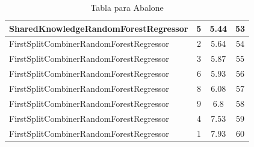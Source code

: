 \begin{table}[h]
\begin{tabular}{|l|c|c|c|}
\textcolor[HTML]{ef9b20}{SharedKnowledgeRandomForestRegressor} & 5 & 5.44 & 53 \\ \hline
\textcolor[HTML]{ea5545}{FirstSplitCombinerRandomForestRegressor} & 2 & 5.64 & 54 \\ \hline
\textcolor[HTML]{ea5545}{FirstSplitCombinerRandomForestRegressor} & 3 & 5.87 & 55 \\ \hline
\textcolor[HTML]{ea5545}{FirstSplitCombinerRandomForestRegressor} & 6 & 5.93 & 56 \\ \hline
\textcolor[HTML]{ea5545}{FirstSplitCombinerRandomForestRegressor} & 8 & 6.08 & 57 \\ \hline
\textcolor[HTML]{ea5545}{FirstSplitCombinerRandomForestRegressor} & 9 & 6.8 & 58 \\ \hline
\textcolor[HTML]{ea5545}{FirstSplitCombinerRandomForestRegressor} & 4 & 7.53 & 59 \\ \hline
\textcolor[HTML]{ea5545}{FirstSplitCombinerRandomForestRegressor} & 1 & 7.93 & 60 \\ \hline
\end{tabular}
\caption{Tabla para Abalone}
\end{table}

